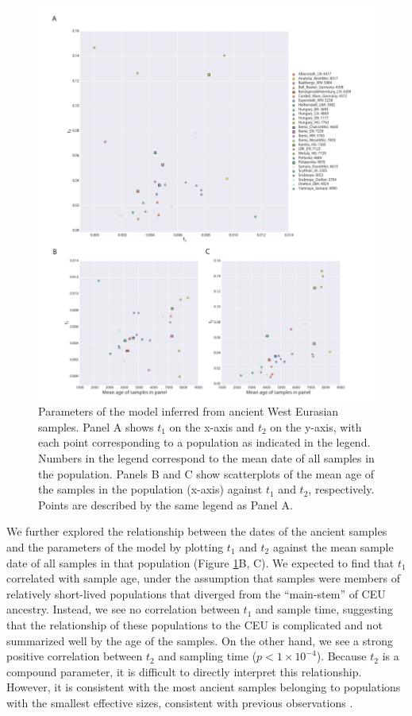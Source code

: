\documentclass[11pt, oneside]{article}   	%
\begin{document}
\begin{figure}[!p] %
   \centering
   \includegraphics[width=\textwidth]{parameters_and_age.pdf} 
   \caption{Parameters of the model inferred from ancient West Eurasian samples. Panel A shows $t_1$ on the x-axis and $t_2$ on the y-axis, with each point corresponding to a population as indicated in the legend. Numbers in the legend correspond to the mean date of all samples in the population. Panels B and C show scatterplots of the mean age of the samples in the population (x-axis) against $t_1$ and $t_2$, respectively. Points are described by the same legend as Panel A.}
   \label{pops_together}
\end{figure}

We further explored the relationship between the dates of the ancient samples and the parameters of the model by plotting $t_1$ and $t_2$ against the mean sample date of all samples in that population (Figure \ref{pops_together}B, C). We expected to find that $t_1$ correlated with sample age, under the assumption that samples were members of relatively short-lived populations that diverged from the ``main-stem'' of CEU ancestry. Instead, we see no correlation between $t_1$ and sample time, suggesting that the relationship of these populations to the CEU is complicated and not summarized well by the age of the samples. On the other hand, we see a strong positive correlation between $t_2$ and sampling time ($p < 1\times10^{-4}$). Because $t_2$ is a compound parameter, it is difficult to directly interpret this relationship. However, it is consistent with the most ancient samples belonging to populations with the smallest effective sizes, consistent with previous observations \citep{skoglund2014genomic}. 
\end{document}
